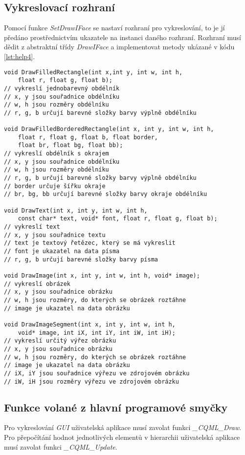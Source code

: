 \documentclass{article}
\begin{document}
\subsection{\label{SEC:drawI}Vykreslovací rozhraní}
Pomocí funkce \textit{SetDrawIFace} se nastaví rozhraní pro vykreslování, to je jí předáno prostřednictvím ukazatele na instanci daného rozhraní. Rozhraní musí dědit z abstraktní třídy \textit{DrawIFace} a implementovat metody ukázané v kódu \ref{lst:help4}.
\begin{lstlisting}[float,frame=single,caption=Metody vykreslovacího rozhraní.,label=lst:help4]
void DrawFilledRectangle(int x,int y, int w, int h,
	float r, float g, float b);
// vykreslí jednobarevný obdélník
// x, y jsou souřadnice obdélníku
// w, h jsou rozměry obdélníku
// r, g, b určují barevné složky barvy výplně obdélníku

void DrawFilledBorderedRectangle(int x, int y, int w, int h, 
	float r, float g, float b, float border, 
	float br, float bg, float bb);
// vykreslí obdélník s okrajem
// x, y jsou souřadnice obdélníku
// w, h jsou rozměry obdélníku
// r, g, b určují barevné složky barvy výplně obdélníku
// border určuje šířku okraje
// br, bg, bb určují barevné složky barvy okraje obdélníku

void DrawText(int x, int y, int w, int h, 
	const char* text, void* font, float r, float g, float b);
// vykreslí text
// x, y jsou souřadnice textu
// text je textový řetězec, který se má vykreslit
// font je ukazatel na data písma
// r, g, b určují barevné složky barvy písma

void DrawImage(int x, int y, int w, int h, void* image);
// vykreslí obrázek
// x, y jsou souřadnice obrázku
// w, h jsou rozměry, do kterých se obrázek roztáhne
// image je ukazatel na data obrázku

void DrawImageSegment(int x, int y, int w, int h,
	void* image, int iX, int iY, int iW, int iH);
// vykreslí určitý výřez obrázku
// x, y jsou souřadnice obrázku
// w, h jsou rozměry, do kterých se obrázek roztáhne
// image je ukazatel na data obrázku
// iX, iY jsou souřadnice výřezu ve zdrojovém obrázku
// iW, iH jsou rozměry výřezu ve zdrojovém obrázku
\end{lstlisting}

\subsection{\label{SEC:updateDraw}Funkce volané z hlavní programové smyčky}
Pro vykreslování \textit{GUI} uživatelská aplikace musí zavolat funkci \textit{\_CQML\_Draw}. Pro přepočítání hodnot jednotlivých elementů v hierarchii uživatelská aplikace musí zavolat funkci \textit{\_CQML\_Update}.
\end{document}
